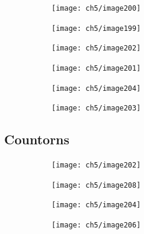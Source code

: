 \begin{figure}[H]
	\centering
	\begin{subfigure}[b]{0.45\textwidth}
		\texttt{[image: ch5/image200]}
	\end{subfigure}
	\begin{subfigure}[b]{0.45\textwidth}
		\texttt{[image: ch5/image199]}
	\end{subfigure}
\end{figure}

\begin{figure}[H]
	\centering
	\begin{subfigure}[b]{0.45\textwidth}
		\texttt{[image: ch5/image202]}
	\end{subfigure}
	\begin{subfigure}[b]{0.45\textwidth}
		\texttt{[image: ch5/image201]}
	\end{subfigure}
\end{figure}

\begin{figure}[H]
	\centering
	\begin{subfigure}[b]{0.45\textwidth}
		\texttt{[image: ch5/image204]}
	\end{subfigure}
	\begin{subfigure}[b]{0.45\textwidth}
		\texttt{[image: ch5/image203]}
	\end{subfigure}
\end{figure}


\subsection{Countorns}

\begin{figure}[H]
	\centering
	\begin{subfigure}[b]{0.45\textwidth}
		\texttt{[image: ch5/image202]}
	\end{subfigure}
	\begin{subfigure}[b]{0.45\textwidth}
		\texttt{[image: ch5/image208]}
	\end{subfigure}
\end{figure}

\begin{figure}[H]
	\centering
	\begin{subfigure}[b]{0.45\textwidth}
		\texttt{[image: ch5/image204]}
	\end{subfigure}
	\begin{subfigure}[b]{0.45\textwidth}
		\texttt{[image: ch5/image206]}
	\end{subfigure}
\end{figure}

